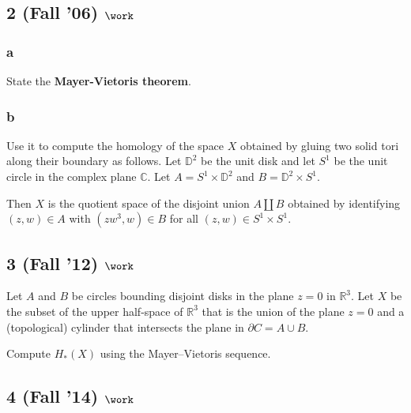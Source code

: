 \hypertarget{fall-06-work-1}{%
\subsection{\texorpdfstring{2 (Fall '06)
\(\work\)}{2 (Fall '06) \textbackslash work}}\label{fall-06-work-1}}

\hypertarget{a-20}{%
\subsubsection{a}\label{a-20}}

State the \textbf{Mayer-Vietoris theorem}.

\hypertarget{b-20}{%
\subsubsection{b}\label{b-20}}

Use it to compute the homology of the space \(X\) obtained by gluing two
solid tori along their boundary as follows. Let \({\mathbb{D}}^2\) be
the unit disk and let \(S^1\) be the unit circle in the complex plane
\({\mathbb{C}}\). Let \(A = S^1 \times {\mathbb{D}}^2\) and
\(B = {\mathbb{D}}^2 \times S^1\).

Then \(X\) is the quotient space of the disjoint union \(A {\coprod}B\)
obtained by identifying \((z, w) \in A\) with \((zw^3 , w) \in B\) for
all \((z, w) \in S^1 \times S^1\).

\hypertarget{fall-12-work-2}{%
\subsection{\texorpdfstring{3 (Fall '12)
\(\work\)}{3 (Fall '12) \textbackslash work}}\label{fall-12-work-2}}

Let \(A\) and \(B\) be circles bounding disjoint disks in the plane
\(z = 0\) in \({\mathbb{R}}^3\). Let \(X\) be the subset of the upper
half-space of \({\mathbb{R}}^3\) that is the union of the plane
\(z = 0\) and a (topological) cylinder that intersects the plane in
\(\partial C = A \cup B\).

Compute \(H_* (X)\) using the Mayer--Vietoris sequence.

\hypertarget{fall-14-work-3}{%
\subsection{\texorpdfstring{4 (Fall '14)
\(\work\)}{4 (Fall '14) \textbackslash work}}\label{fall-14-work-3}}

